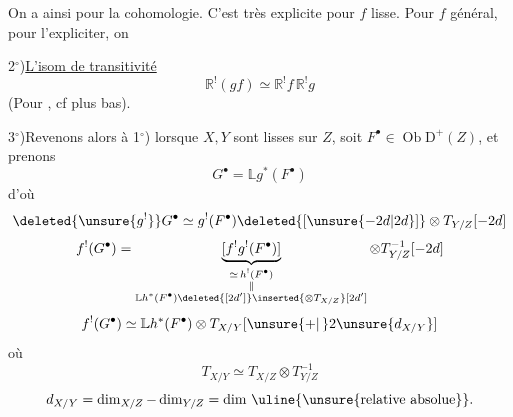 On a ainsi 
pour la cohomologie. C'est très explicite pour
$f$ lisse. Pour $f$ général, pour l'expliciter,
on  

2$^\circ$)\quad \uline{L'isom de transitivité}
\[
\mathbb{R}^!(gf)\simeq \mathbb{R}^!f\,\mathbb{R}^!g
\]
(Pour , cf plus bas).

3$^\circ$)\quad Revenons alors à 1$^\circ$) lorsque $X,Y$
sont lisses sur $Z$, soit $F^\bullet\in\operatorname{Ob}\mathrm D^+(Z)$,
et prenons 
\[
G^\bullet=\mathbb{L}g^*(F^\bullet)
\]
d'où 
\[
\deleted{\unsure{g^!}}G^\bullet\simeq g^!(F^\bullet)\deleted{[\unsure{-2d|2d}]}
 \otimes T_{Y/Z}[-2d]
\]
\[
f^!(G^\bullet)=
 \underbrace{[f^!g^!(F^\bullet)]}_{\substack{
  \simeq\,h^!(F^\bullet)\\
  \Vert\\\mathbb{L}h^*(F^\bullet)\deleted{[2d']}\inserted{\otimes T_{X/Z}}[2d']}}
 \otimes T_{Y/Z}^{-1}[-2d]
\]
\[
f^!(G^\bullet)\simeq \mathbb{L}h^*(F^\bullet)\otimes T_{X/Y}
 [\unsure{+|\,}2\unsure{d_{X/Y}}]
\]
où
\[
T_{X/Y}\simeq T_{X/Z}\otimes T_{Y/Z}^{-1}
\]
\[
d_{X/Y}=\dim_{X/Z}-\dim_{Y/Z}
 =\text{dim \uline{\unsure{relative absolue}}}.
\]
